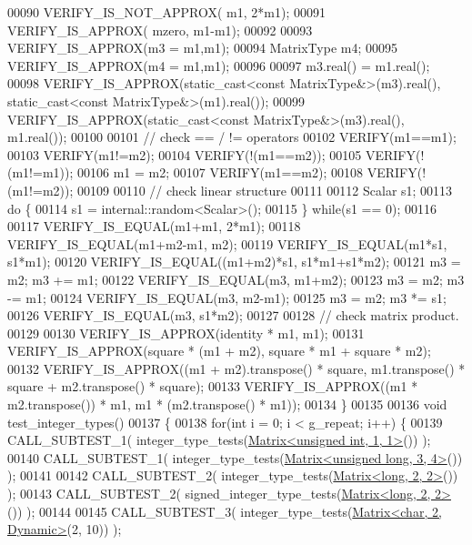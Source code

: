 \begin{DoxyCode}
00090   VERIFY\_IS\_NOT\_APPROX(           m1,    2*m1);
00091   VERIFY\_IS\_APPROX(               mzero, m1-m1);
00092 
00093   VERIFY\_IS\_APPROX(m3 = m1,m1);
00094   MatrixType m4;
00095   VERIFY\_IS\_APPROX(m4 = m1,m1);
00096 
00097   m3.real() = m1.real();
00098   VERIFY\_IS\_APPROX(static\_cast<const MatrixType&>(m3).real(), static\_cast<const MatrixType&>(m1).real());
00099   VERIFY\_IS\_APPROX(static\_cast<const MatrixType&>(m3).real(), m1.real());
00100 
00101   \textcolor{comment}{// check == / != operators}
00102   VERIFY(m1==m1);
00103   VERIFY(m1!=m2);
00104   VERIFY(!(m1==m2));
00105   VERIFY(!(m1!=m1));
00106   m1 = m2;
00107   VERIFY(m1==m2);
00108   VERIFY(!(m1!=m2));
00109 
00110   \textcolor{comment}{// check linear structure}
00111 
00112   Scalar s1;
00113   \textcolor{keywordflow}{do} \{
00114     s1 = internal::random<Scalar>();
00115   \} \textcolor{keywordflow}{while}(s1 == 0);
00116 
00117   VERIFY\_IS\_EQUAL(m1+m1,                   2*m1);
00118   VERIFY\_IS\_EQUAL(m1+m2-m1,                m2);
00119   VERIFY\_IS\_EQUAL(m1*s1,                   s1*m1);
00120   VERIFY\_IS\_EQUAL((m1+m2)*s1,              s1*m1+s1*m2);
00121   m3 = m2; m3 += m1;
00122   VERIFY\_IS\_EQUAL(m3,                      m1+m2);
00123   m3 = m2; m3 -= m1;
00124   VERIFY\_IS\_EQUAL(m3,                      m2-m1);
00125   m3 = m2; m3 *= s1;
00126   VERIFY\_IS\_EQUAL(m3,                      s1*m2);
00127 
00128   \textcolor{comment}{// check matrix product.}
00129 
00130   VERIFY\_IS\_APPROX(identity * m1, m1);
00131   VERIFY\_IS\_APPROX(square * (m1 + m2), square * m1 + square * m2);
00132   VERIFY\_IS\_APPROX((m1 + m2).transpose() * square, m1.transpose() * square + m2.transpose() * square);
00133   VERIFY\_IS\_APPROX((m1 * m2.transpose()) * m1, m1 * (m2.transpose() * m1));
00134 \}
00135 
00136 \textcolor{keywordtype}{void} test\_integer\_types()
00137 \{
00138   \textcolor{keywordflow}{for}(\textcolor{keywordtype}{int} i = 0; i < g\_repeat; i++) \{
00139     CALL\_SUBTEST\_1( integer\_type\_tests(\hyperlink{group___core___module_class_eigen_1_1_matrix}{Matrix<unsigned int, 1, 1>}()) );
00140     CALL\_SUBTEST\_1( integer\_type\_tests(\hyperlink{group___core___module_class_eigen_1_1_matrix}{Matrix<unsigned long, 3, 4>}()) );
00141 
00142     CALL\_SUBTEST\_2( integer\_type\_tests(\hyperlink{group___core___module_class_eigen_1_1_matrix}{Matrix<long, 2, 2>}()) );
00143     CALL\_SUBTEST\_2( signed\_integer\_type\_tests(\hyperlink{group___core___module_class_eigen_1_1_matrix}{Matrix<long, 2, 2>}()) );
00144 
00145     CALL\_SUBTEST\_3( integer\_type\_tests(\hyperlink{group___core___module_class_eigen_1_1_matrix}{Matrix<char, 2, Dynamic>}(2, 10)) );

\end{DoxyCode}
